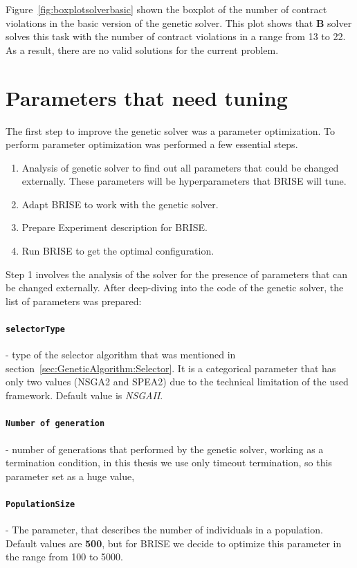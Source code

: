 Figure~\ref{fig:boxplotsolverbasic} shown the boxplot of the number of contract violations in the basic version of the genetic solver. This plot shows that \textbf{B} solver solves this task with the number of contract violations in a range from 13 to 22. As a result, there are no valid solutions for the current problem.




\section{Parameters that need tuning}

The first step to improve the genetic solver was a parameter optimization. To perform parameter optimization was performed a few essential steps.

\begin{enumerate}
	\item Analysis of genetic solver to find out all parameters that could be changed externally. These parameters will be hyperparameters that BRISE will tune.
	\item Adapt BRISE to work with the genetic solver.
	\item Prepare Experiment description for BRISE.
	\item Run BRISE to get the optimal configuration.
\end{enumerate}

Step 1 involves the analysis of the solver for the presence of parameters that can be changed externally. After deep-diving into the code of the genetic solver, the list of parameters was prepared:
\paragraph{\texttt{selectorType}} - type of the selector algorithm that was mentioned in section~\ref{sec:GeneticAlgorithm:Selector}. It is a categorical parameter that has only two values (NSGA2 and SPEA2) due to the technical limitation of the used framework. Default value is \textit{NSGAII}.
\paragraph{\texttt{Number of generation}} - number of generations that performed by the genetic solver, working as a termination condition, in this thesis we use only timeout termination, so this parameter set as a huge value,
\paragraph{\texttt{PopulationSize}} - The parameter, that describes the number of individuals in a population. Default values are \textbf{500}, but for BRISE we decide to optimize this parameter in the range from 100 to 5000.\\


